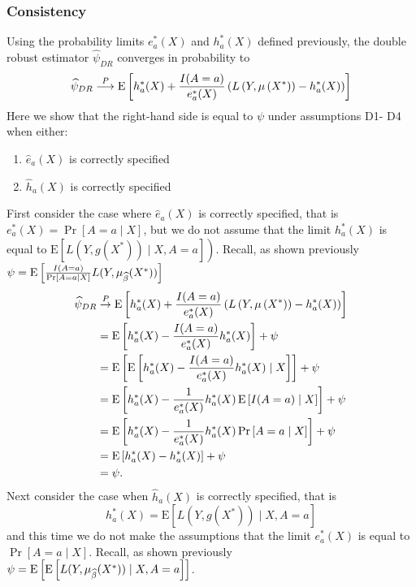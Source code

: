 
\subsubsection{Consistency}
Using the probability limits $e_a^*(X)$ and $h_a^*(X)$ defined previously, the double robust estimator $\widehat{\psi}_{DR}$ converges in probability to 
$$\widehat{\psi}_{DR} \stackrel{P}{\longrightarrow} \operatorname{E}\left[h^*_a(X)+\frac{I(A = a)}{e^*_a(X)}\left(L\left(Y, \mu\left(X^*\right)\right)-h^*_a(X)\right)\right]$$
Here we show that the right-hand side is equal to $\psi$ under assumptions D1-
D4 when either:
\begin{enumerate}
    \item $\widehat{e}_a(X)$ is correctly specified
    \item $\widehat{h}_a(X)$ is correctly specified
\end{enumerate}
First consider the case where $\widehat{e}_a(X)$ is correctly specified, that is $e^*_a(X)=\operatorname{Pr}[A=a \mid X]$, but we do not assume that the limit $h^*_a(X)$ is equal to $\left.\mathrm{E}\left[L\left(Y, g\left(X^*\right)\right) \mid X, A=a\right]\right)$. Recall, as shown previously $\psi = \operatorname{E}\left[\frac{I(A = a)}{\Pr[A = a \mid X]}L(Y, \mu_{\widehat{\beta}}(X^*))\right] $
$$
\begin{aligned}
\widehat{\psi}_{DR} & \stackrel{P}{\rightarrow}  \operatorname{E}\left[h^*_a(X)+\frac{I(A = a)}{e^*_a(X)}\left(L\left(Y, \mu\left(X^*\right)\right)-h^*_a(X)\right)\right] \\
& =\operatorname{E}\left[h^*_a(X)-\frac{I(A = a)}{e^*_a(X)}h^*_a(X)\right]+\psi \\
& =\operatorname{E}\left[\operatorname{E}\left[h^*_a(X)-\frac{I(A = a)}{e^*_a(X)}h^*_a(X) \mid X \right]\right]+\psi \\
& =\operatorname{E}\left[h^*_a(X)-\frac{1}{e^*_a(X)}h^*_a(X) \operatorname{E}\left[I(A = a) \mid X \right]\right]+\psi \\
& =\operatorname{E}\left[h^*_a(X)-\frac{1}{e^*_a(X)}h^*_a(X) \Pr\left[A = a \mid X \right]\right]+\psi \\
& =\operatorname{E}\left[h^*_a(X)-h^*_a(X)\right]+\psi \\
& =\psi .
\end{aligned}
$$
Next consider the case when $\widehat{h}_a(X)$ is correctly specified, that is
$$
h^*_a(X)=\mathrm{E}\left[L\left(Y, g\left(X^*\right)\right) \mid X, A=a\right]
$$
and this time we do not make the assumptions that the limit $e^*_a(X)$ is equal to $\operatorname{Pr}[A=a \mid X]$. Recall, as shown previously $\psi = \operatorname{E}\left[\operatorname{E}\left[L(Y, \mu_{\widehat{\beta}}(X^*))\mid X, A = a\right]\right] $. 

